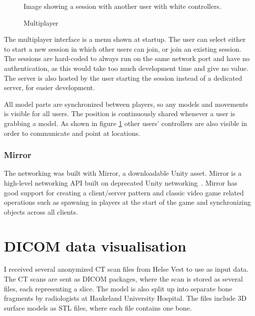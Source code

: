 \documentclass[a4paper]{report}
\begin{document}
\begin{figure}[h!]
    \centering
	\hfill
	\caption{Multiplayer}\label{multiplayer}
  \small
  Image showing a session with another user with white controllers.
\end{figure}

The multiplayer interface is a menu shown at startup. The user can select either to start a new session in which other users can join, or join an existing session. The sessions are hard-coded to always run on the same network port and have no authentication, as this would take too much development time and give no value. The server is also hosted by the user starting the session instead of a dedicated server, for easier development.

All model parts are synchronized between players, so any models and movements is visible for all users. The position is continuously shared whenever a user is grabbing a model. As shown in figure \ref{multiplayer} other users' controllers are also visible in order to communicate and point at locations.


\subsubsection{Mirror}
The networking was built with Mirror, a downloadable Unity asset. Mirror is a high-level networking API built on deprecated Unity networking~\cite{noauthor_mirror_nodate}. Mirror has good support for creating a client/server pattern and classic video game related operations such as spawning in players at the start of the game and synchronizing objects across all clients.

\section{DICOM data visualisation}
I received several anonymized CT scan files from Helse Vest to use as input data. The CT scans are sent as DICOM packages, where the scan is stored as several files, each representing a slice.
The model is also split up into separate bone fragments by radiologists at Haukeland University Hospital. The files include 3D surface models as STL files, where each file contains one bone.
\end{document}
